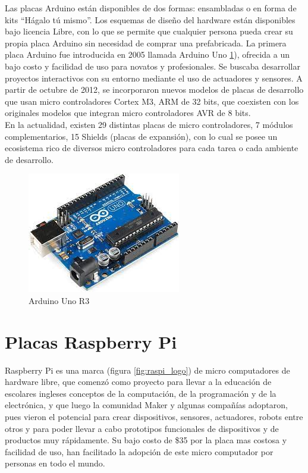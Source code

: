 Las placas Arduino están disponibles de dos formas: ensambladas o en forma de kits ``Hágalo tú mismo''. Los esquemas de diseño del hardware están disponibles bajo licencia Libre, con lo que se permite que cualquier persona pueda crear su propia placa Arduino sin necesidad de comprar una prefabricada. La primera placa Arduino fue introducida en 2005 llamada Arduino Uno \ref{fig:arduinouno}), ofrecida a un bajo costo y facilidad de uso para novatos y profesionales. Se buscaba desarrollar proyectos interactivos con su entorno mediante el uso de actuadores y sensores. A partir de octubre de 2012, se incorporaron nuevos modelos de placas de desarrollo que usan micro controladores Cortex M3, ARM de 32 bits, que coexisten con los originales modelos que integran micro controladores AVR de 8 bits.\\

En la actualidad, existen 29 distintas placas de micro controladores, 7 módulos complementarios, 15 Shields (placas de expansión), con lo cual se posee un ecosistema rico de diversos micro controladores para cada tarea o cada ambiente de desarrollo. 

\begin{figure}[htb]
\centering
\includegraphics[scale=0.7]{./Figuras/arduino_uno.jpeg}
\caption{Arduino Uno R3}
\label{fig:arduinouno}
\vspace*{-10pt}
\end{figure}

\section{Placas Raspberry Pi}
Raspberry Pi es una marca (figura \ref{fig:raspi_logo}) de micro computadores de hardware libre, que comenzó como proyecto para llevar a la educación  de escolares ingleses conceptos de la computación, de la programación y de la electrónica, y que luego la comunidad Maker y algunas compañías adoptaron, pues vieron el potencial para crear dispositivos, sensores, actuadores, robots entre otros y para poder llevar a cabo prototipos funcionales de dispositivos y de productos muy rápidamente. Su bajo costo de \$35 por la placa mas costosa y facilidad de uso, han facilitado la adopción de este micro computador por personas en todo el mundo.

